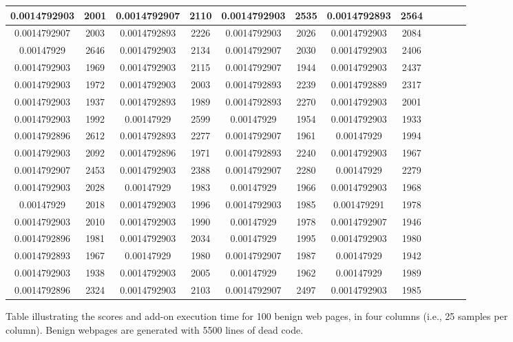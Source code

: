 \begin{figure}[h]
\begin{tabular}{|c|c|c|c|c|c|c|c|c|c|c|c|}
\midrule
0.0014792903&2001&0.0014792907&2110&0.0014792903&2535&0.0014792893&2564\\
\midrule
0.0014792907&2003&0.0014792893&2226&0.0014792903&2026&0.0014792903&2084\\
\midrule
0.00147929&2646&0.0014792903&2134&0.0014792907&2030&0.0014792903&2406\\
\midrule
0.0014792903&1969&0.0014792903&2115&0.0014792907&1944&0.0014792903&2437\\
\midrule
0.0014792903&1972&0.0014792903&2003&0.0014792893&2239&0.0014792889&2317\\
\midrule
0.0014792903&1937&0.0014792893&1989&0.0014792893&2270&0.0014792903&2001\\
\midrule
0.0014792903&1992&0.00147929&2599&0.00147929&1954&0.0014792903&1933\\
\midrule
0.0014792896&2612&0.0014792893&2277&0.0014792907&1961&0.00147929&1994\\
\midrule
0.0014792903&2092&0.0014792896&1971&0.0014792893&2240&0.0014792903&1967\\
\midrule
0.0014792907&2453&0.0014792903&2388&0.0014792907&2280&0.00147929&2279\\
\midrule
0.0014792903&2028&0.00147929&1983&0.00147929&1966&0.0014792903&1968\\
\midrule
0.00147929&2018&0.0014792903&1996&0.0014792903&1985&0.001479291&1978\\
\midrule
0.0014792903&2010&0.0014792903&1990&0.00147929&1978&0.0014792907&1946\\
\midrule
0.0014792896&1981&0.0014792903&2034&0.00147929&1995&0.0014792903&1980\\
\midrule
0.0014792893&1967&0.00147929&1980&0.0014792907&1987&0.00147929&1942\\
\midrule
0.0014792903&1938&0.0014792903&2005&0.00147929&1962&0.00147929&1989\\
\midrule
0.0014792896&2324&0.0014792903&2103&0.0014792907&2497&0.0014792903&1985\\
\midrule
\end{tabular}
    \caption[Scores table of benign web pages]{Table illustrating the scores and add-on execution time for 100 benign web pages, in four columns (i.e., 25 samples per column). Benign webpages are generated with 5500 lines of dead code.}
    \label{fig:b5500table}
\end{figure}
